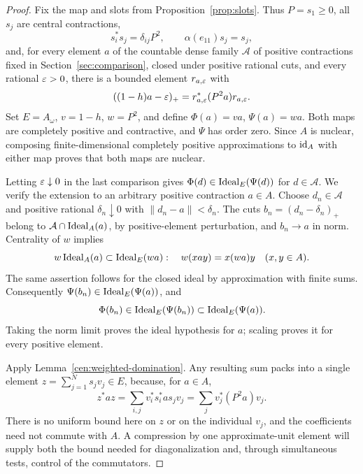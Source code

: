 \begin{proof}
Fix the map and slots from Proposition~\ref{prop:slots}.  Thus
$P=s_1\ge0$, all $s_j$ are central contractions,
\begin{equation}\label{cen:slot-recall}
 s_i^*s_j=\delta_{ij}P^2,\qquad
 \alpha(e_{11})s_j=s_j,
\end{equation}
and, for every element $a$ of the countable dense family
$\mathcal A$ of positive contractions fixed in
Section~\ref{sec:comparison}, closed under positive rational cuts, and
every rational $\varepsilon>0$, there is a bounded element $r_{a,\varepsilon}$
with
\[
 ((1-h)a-\varepsilon)_+=r_{a,\varepsilon}^*(P^2a)r_{a,\varepsilon}.
\]
Set $E=A_\omega$, $v=1-h$, $w=P^2$, and define
$\Phi(a)=va$, $\Psi(a)=wa$.  Both maps are completely positive
and contractive, and $\Psi$ has order zero.  Since $A$ is nuclear,
composing finite-dimensional completely positive approximations to
$\operatorname{id}_A$ with either map proves that both maps are nuclear.

Letting $\varepsilon\downarrow0$ in the last comparison gives
$\Phi(d)\in\operatorname{Ideal}_E(\Psi(d))$ for $d\in\mathcal A$.  We verify
the extension to an arbitrary positive contraction $a\in A$.  Choose
$d_n\in\mathcal A$ and positive rational $\delta_n\downarrow0$
with $\|d_n-a\|<\delta_n$.  The cuts
$b_n=(d_n-\delta_n)_+$ belong to $\mathcal A\cap\operatorname{Ideal}_A(a)$,
by positive-element perturbation, and $b_n\to a$ in norm.
Centrality of $w$ implies
\begin{equation}\label{cen:ideal-extension}
 w\operatorname{Ideal}_A(a)\subset\operatorname{Ideal}_E(wa):
 \quad w(xay)=x(wa)y\quad(x,y\in A).
\end{equation}
The same assertion follows for the closed ideal by approximation with
finite sums.  Consequently $\Psi(b_n)\in\operatorname{Ideal}_E(\Psi(a))$, and
\[
 \Phi(b_n)\in\operatorname{Ideal}_E(\Psi(b_n))
             \subset\operatorname{Ideal}_E(\Psi(a)).
\]
Taking the norm limit proves the ideal hypothesis for $a$; scaling
proves it for every positive element.

Apply Lemma~\ref{cen:weighted-domination}.  Any resulting sum packs
into a single element
$z=\sum_{j=1}^N s_jv_j\in E$, because, for $a\in A$,
\begin{equation}\label{cen:packed-sum}
 z^*az=\sum_{i,j}v_i^*s_i^*as_jv_j
      =\sum_jv_j^*(P^2a)v_j.
\end{equation}
There is no uniform bound here on $z$ or on the individual $v_j$,
and the coefficients need not commute with $A$.  A compression by
one approximate-unit element will supply both the bound needed for
diagonalization and, through simultaneous tests, control of the
commutators.


\end{proof}
